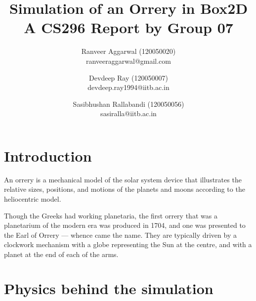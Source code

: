 \documentclass[12pt]{report}
\title{Simulation of an Orrery in Box2D\\ A CS296 Report by Group 07}
\author{Ranveer Aggarwal (120050020) \\ ranveeraggarwal@gmail.com \and Devdeep Ray (120050007) \\ devdeep.ray1994@iitb.ac.in \and Sasibhushan Rallabandi (120050056) \\ sasiralla@iitb.ac.in}
\date{}
\begin{document}
\maketitle

\chapter*{Introduction}
An orrery is a mechanical model of the solar system device that illustrates the relative sizes, positions, and motions of the planets and moons according to the heliocentric model.

\begin{center}
\setlength\fboxsep{2pt}
\setlength\fboxrule{1pt}
\end{center}

Though the Greeks had working planetaria, the first orrery that was a planetarium of the modern era was produced in 1704, and one was presented to the Earl of Orrery — whence came the name. They are typically driven by a clockwork mechanism with a globe representing the Sun at the centre, and with a planet at the end of each of the arms.


\pagebreak

\chapter*{Physics behind the simulation}

\begin{center}
\setlength\fboxsep{2pt}
\setlength\fboxrule{1pt}
\end{center}

\pagebreak

\end{document}
